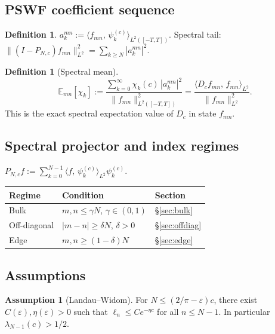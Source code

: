 \documentclass[12pt,a4paper]{amsart}
\theoremstyle{definition}
\newtheorem{definition}[theorem]{Definition}
\newtheorem{assumption}[theorem]{Assumption}
\newcommand{\PN}{P_{N,c}}
\newcommand{\ip}[2]{\langle #1,\, #2\rangle}
\newcommand{\Emn}{\mathbb{E}_{mn}}
\begin{document}
\subsection{PSWF coefficient sequence}

\begin{definition}\label{def:coeff}
$a_k^{mn} := \ip{f_{mn}}{\psi_k^{(c)}}_{L^2([-T,T])}$.
Spectral tail:
$\|(I-\PN)f_{mn}\|_{L^2}^2 = \sum_{k \ge N}|a_k^{mn}|^2$.
\end{definition}

\begin{definition}[Spectral mean]\label{def:spectral-mean}
\begin{equation}\label{eq:spectral-mean-def}
  \Emn[\chi_k]
  := \frac{\displaystyle\sum_{k=0}^{\infty}\chi_k(c)\,|a_k^{mn}|^2}
           {\|f_{mn}\|_{L^2([-T,T])}^2}
  = \frac{\ip{D_c f_{mn}}{f_{mn}}_{L^2}}{\|f_{mn}\|_{L^2}^2}.
\end{equation}
This is the exact spectral expectation value of $D_c$ in state $f_{mn}$.
\end{definition}

\subsection{Spectral projector and index regimes}

$\PN f := \sum_{k=0}^{N-1}\ip{f}{\psi_k^{(c)}}_{L^2}\psi_k^{(c)}$.

\begin{center}
\renewcommand{\arraystretch}{1.3}
\begin{tabular}{lll}
\toprule
Regime       & Condition                            & Section \\
\midrule
Bulk         & $m,n \le \gamma N$, $\gamma\in(0,1)$ & \S\ref{sec:bulk}    \\
Off-diagonal & $|m-n| \ge \delta N$, $\delta>0$     & \S\ref{sec:offdiag} \\
Edge         & $m,n \ge (1-\delta)N$                & \S\ref{sec:edge}    \\
\bottomrule
\end{tabular}
\end{center}

\subsection{Assumptions}

\begin{assumption}[Landau--Widom]\label{ass:lw}
For $N \le (2/\pi-\varepsilon)c$, there exist
$C(\varepsilon),\eta(\varepsilon) > 0$ such that
$\ell_n \le Ce^{-\eta c}$ for all $n \le N-1$.
In particular $\lambda_{N-1}(c) > 1/2$.
\end{assumption}
\end{document}
